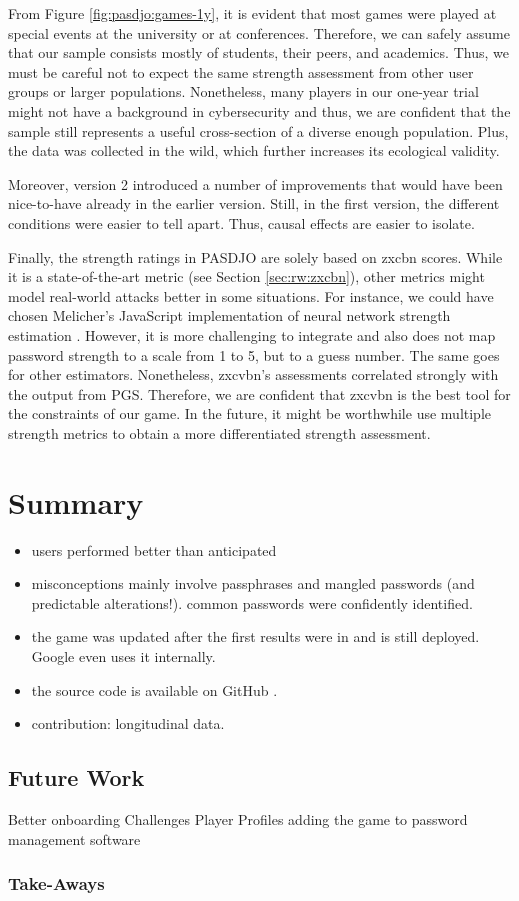 From Figure \ref{fig:pasdjo:games-1y}, it is evident that most games were played at special events at the university or at conferences. Therefore, we can safely assume that our sample consists mostly of students, their peers, and academics. Thus, we must be careful not to expect the same strength assessment from other user groups or larger populations. Nonetheless, many players in our one-year trial might not have a background in cybersecurity and thus, we are confident that the sample still represents a useful cross-section of a diverse enough population. Plus, the data was collected in the wild, which further increases its ecological validity. 

Moreover, version 2 introduced a number of improvements that would have been nice-to-have already in the earlier version. Still, in the first version, the different conditions were easier to tell apart. Thus, causal effects are easier to isolate. 

Finally, the strength ratings in PASDJO are solely based on zxcbn scores. While it is a state-of-the-art metric (see Section \ref{sec:rw:zxcbn}), other metrics might model real-world attacks better in some situations. For instance, we could have chosen Melicher's JavaScript implementation of neural network strength estimation \cite{Melicher2016NeuralNetworks}. However, it is more challenging to integrate and also does not map password strength to a scale from 1 to 5, but to a guess number. The same goes for other estimators. Nonetheless, zxcvbn's assessments correlated strongly with the output from \gls{PGS}. Therefore, we are confident that zxcvbn is the best tool for the constraints of our game. In the future, it might be worthwhile use multiple strength metrics to obtain a more differentiated strength assessment.

\section{Summary}
\begin{itemize}
	\item users performed better than anticipated
	\item misconceptions mainly involve passphrases and mangled passwords (and predictable alterations!). common passwords were confidently identified. 
	\item the game was updated after the first results were in and is still deployed. Google even uses it internally. 
	\item the source code is available on GitHub .
	\item contribution: longitudinal data.
\end{itemize}


\subsection{Future Work}
Better onboarding
Challenges
Player Profiles 
adding the game to password management software


\subsubsection{Take-Aways}



